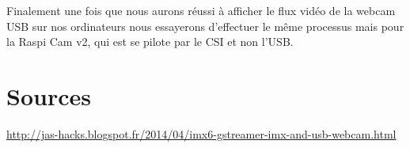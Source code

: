 Finalement une fois que nous aurons réussi à afficher le flux vidéo de la webcam USB
sur nos ordinateurs nous essayerons d’effectuer le même processus mais pour la Raspi Cam v2,
qui est se pilote par le CSI et non l’USB.

\section{Sources}

\href{http://jas-hacks.blogspot.fr/2014/04/imx6-gstreamer-imx-and-usb-webcam.html}{http://jas-hacks.blogspot.fr/2014/04/imx6-gstreamer-imx-and-usb-webcam.html}